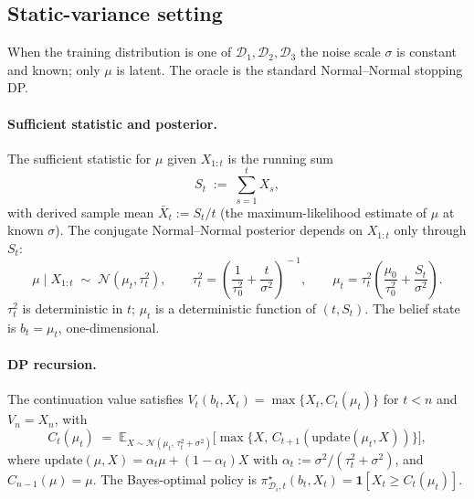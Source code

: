 \documentclass[11pt]{article}
\begin{document}
\subsection{Static-variance setting}
\label{sec:oracle-static}

When the training distribution is one of $\mathcal{D}_1, \mathcal{D}_2, \mathcal{D}_3$ the noise scale $\sigma$ is constant and known; only $\mu$ is latent. The oracle is the standard Normal--Normal stopping DP.

\paragraph{Sufficient statistic and posterior.} The sufficient statistic for $\mu$ given $X_{1:t}$ is the running sum
\[
S_t \;:=\; \sum_{s=1}^t X_s,
\]
with derived sample mean $\bar X_t := S_t / t$ (the maximum-likelihood estimate of $\mu$ at known $\sigma$). The conjugate Normal--Normal posterior depends on $X_{1:t}$ only through $S_t$:
\begin{equation}
\label{eq:mu-static}
\mu \mid X_{1:t} \;\sim\; \mathcal{N}(\mu_t, \tau_t^2),
\qquad
\tau_t^2 = \!\left(\frac{1}{\tau_0^2} + \frac{t}{\sigma^2}\right)^{\!-1},
\qquad
\mu_t = \tau_t^2\!\left(\frac{\mu_0}{\tau_0^2} + \frac{S_t}{\sigma^2}\right).
\end{equation}
$\tau_t^2$ is deterministic in $t$; $\mu_t$ is a deterministic function of $(t, S_t)$. The belief state is $b_t = \mu_t$, one-dimensional.

\paragraph{DP recursion.} The continuation value satisfies $V_t(b_t, X_t) = \max\{X_t, C_t(\mu_t)\}$ for $t < n$ and $V_n = X_n$, with
\begin{equation}
\label{eq:Crec-static}
C_t(\mu_t) \;=\; \mathbb{E}_{X \sim \mathcal{N}(\mu_t,\, \tau_t^2 + \sigma^2)}\!\Big[\max\!\big\{X,\, C_{t+1}(\mathrm{update}(\mu_t, X))\big\}\Big],
\end{equation}
where $\mathrm{update}(\mu, X) = \alpha_t \mu + (1 - \alpha_t) X$ with $\alpha_t := \sigma^2/(\tau_t^2 + \sigma^2)$, and $C_{n-1}(\mu) = \mu$. The Bayes-optimal policy is $\pi^\star_{\mathcal{D}_i, t}(b_t, X_t) = \mathbf{1}[X_t \ge C_t(\mu_t)]$.
\end{document}
